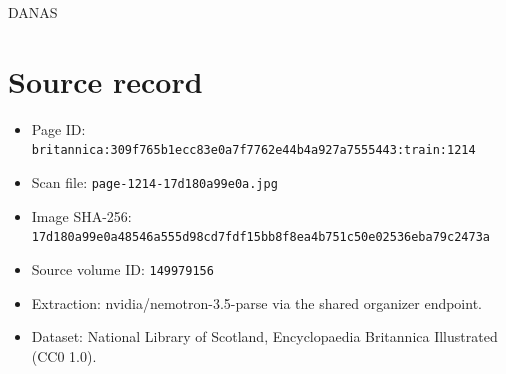 \documentclass{article}
\begin{document}
DANAS

\section*{Source record}
\begin{itemize}
\item Page ID: \texttt{britannica:309f765b1ecc83e0a7f7762e44b4a927a7555443:train:1214}
\item Scan file: \texttt{page-1214-17d180a99e0a.jpg}
\item Image SHA-256: \texttt{17d180a99e0a48546a555d98cd7fdf15bb8f8ea4b751c50e02536eba79c2473a}
\item Source volume ID: \texttt{149979156}
\item Extraction: nvidia/nemotron-3.5-parse via the shared organizer endpoint.
\item Dataset: National Library of Scotland, Encyclopaedia Britannica Illustrated (CC0 1.0).
\end{itemize}
\end{document}
